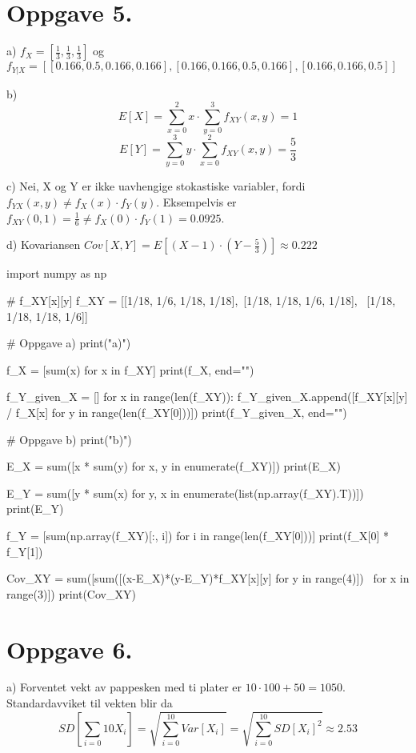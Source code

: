 \documentclass[a4paper,11pt,norsk]{article}
\begin{document}
\section*{Oppgave 5.}
a) $f_X = [\frac{1}{3}, \frac{1}{3}, \frac{1}{3}]$ og $f_{Y|X} = [[0.166, 0.5, 0.166, 0.166], [0.166, 0.166, 0.5, 0.166], [0.166, 0.166, 0.5]]$

b)
\[
    E[X] = \sum_{x=0}^{2} x \cdot \sum_{y=0}^{3} f_{XY}(x, y) = 1
\]
\[
    E[Y] = \sum_{y=0}^{3} y \cdot \sum_{x=0}^{2} f_{XY}(x, y) = \frac{5}{3}
\]

c) Nei, X og Y er ikke uavhengige stokastiske variabler, fordi $f_{YX}(x, y) \neq f_X(x) \cdot f_Y(y)$.
Eksempelvis er $f_{XY}(0, 1) = \frac{1}{6} \neq f_X(0) \cdot f_Y(1) = 0.0925$. 

d) Kovariansen $Cov[X, Y] = E[(X - 1) \cdot (Y - \frac{5}{3})] \approx 0.222$ 

\begin{pythoncode}
import numpy as np

# f_XY[x][y]
f_XY = [[1/18, 1/6, 1/18, 1/18],\ 
       [1/18, 1/18, 1/6, 1/18], \
       [1/18, 1/18, 1/18, 1/6]]

# Oppgave a)
print("\nOppgave a)")

f_X = [sum(x) for x in f_XY]
print(f_X, end="\n\n")

f_Y_given_X = []
for x in range(len(f_XY)):
    f_Y_given_X.append([f_XY[x][y] / f_X[x] for y in range(len(f_XY[0]))])
print(f_Y_given_X, end="\n\n")

# Oppgave b)
print("\nOppgave b)")

E_X = sum([x * sum(y) for x, y in enumerate(f_XY)])
print(E_X)

E_Y = sum([y * sum(x) for y, x in enumerate(list(np.array(f_XY).T))]) 
print(E_Y)

f_Y = [sum(np.array(f_XY)[:, i]) for i in range(len(f_XY[0]))]
print(f_X[0] * f_Y[1])

Cov_XY = sum([sum([(x-E_X)*(y-E_Y)*f_XY[x][y] for y in range(4)]) \
         for x in range(3)])
print(Cov_XY)
\end{pythoncode}

\section*{Oppgave 6.}
a) Forventet vekt av pappesken med ti plater er $10 \cdot 100 + 50 = 1050$. \\
Standardavviket til vekten blir da
\[
    SD\left[\sum_{i=0}{10}X_i\right] = \sqrt{\sum_{i=0}^{10}Var[X_i]} = \sqrt{\sum_{i=0}^{10}SD[X_i]^2} \approx 2.53
\]
\end{document}

